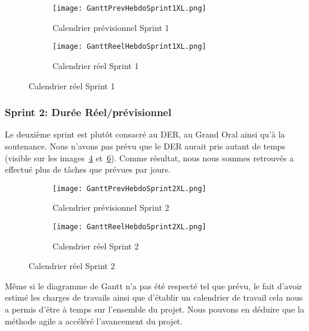\begin{figure}
   \centering
   \begin{subfigure}{.5\textwidth}
     \centering
     \texttt{[image: GanttPrevHebdoSprint1XL.png]}
   	\caption[]{Calendrier prévisionnel Sprint 1}
   	\label{fig:gantPrevHebdo1}
   \end{subfigure}%
   \begin{subfigure}{.5\textwidth}
     \centering
     \texttt{[image: GanttReelHebdoSprint1XL.png]}
   	\caption[]{Calendrier réel Sprint 1}
   	\label{fig:GantReelHebdo1}
   \end{subfigure}
\end{figure}


\subsubsection{Sprint 2: Durée Réel/prévisionnel}
Le deuxième sprint est plutôt consacré au DER, au Grand Oral ainsi qu'à la soutenance.
Nous n'avons pas prévu que le DER aurait pris autant de temps (visible sur les images~\ref{fig:gantPrevHebdo2} et~\ref{fig:GantReelHebdo2}).
Comme résultat, nous nous sommes retrouvés a effectué plus de tâches que prévues par jours. 

\begin{figure}
  \centering
  \begin{subfigure}{.5\textwidth}
    \centering
    \texttt{[image: GanttPrevHebdoSprint2XL.png]}
  	\caption[]{Calendrier prévisionnel Sprint 2}
  	\label{fig:gantPrevHebdo2}
  \end{subfigure}%
  \begin{subfigure}{.5\textwidth}
    \centering
    \texttt{[image: GanttReelHebdoSprint2XL.png]}
  	\caption[]{Calendrier réel Sprint 2}
  	\label{fig:GantReelHebdo2}
  \end{subfigure}
\end{figure}

Même si le diagramme de Gantt n'a pas été respecté tel que prévu, le fait d’avoir estimé les charges de travails ainsi que d'établir un calendrier de travail cela nous a permis d'être à temps sur l'ensemble du projet.
Nous pouvons en déduire que la méthode agile a accéléré l'avancement du projet.








